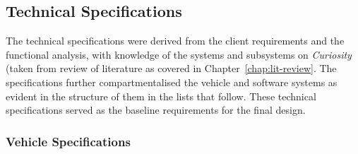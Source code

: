  \subsection{Technical Specifications}
  \label{sec:probDef-technicalSpecs}
    The technical specifications were derived from the client requirements and the functional analysis, with knowledge of the systems and subsystems on \textit{Curiosity} (taken from review of literature as covered in Chapter~\ref{chap:lit-review}. The specifications further compartmentalised the vehicle and software systems as evident in the structure of them in the lists that follow. These technical specifications served as the baseline requirements for the final design.

    \subsubsection{Vehicle Specifications}
    \label{subsec:probDef-vehicleSpecifications}
